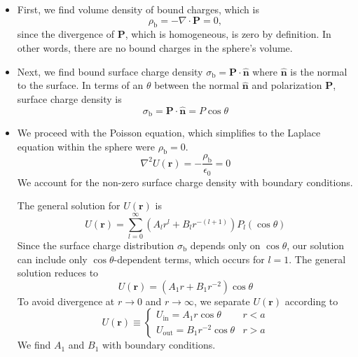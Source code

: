 \documentclass[11pt, a4paper]{article}
\renewcommand{\vec}[1]{\bm{#1}} %
\newcommand{\uvec}[1]{\hat{\vec{#1}}} %
\renewcommand{\r}{\vec{r}}
\newcommand{\ee}{\epsilon_{0}}  %
\renewcommand{\P}{\vec{P}}  %
\renewcommand{\div}{\nabla \cdot}
\renewcommand{\laplacian}{\nabla^{2}}
\begin{document}
\begin{itemize}
	\item First, we find volume density of bound charges, which is
	\begin{equation*}
		\rho_{\text{b}} = - \div \P = 0,
	\end{equation*}
	since the divergence of $ \P $, which is homogeneous, is zero by definition. In other words, there are no bound charges in the sphere's volume. 
	
	\item Next, we find bound surface charge density $ \sigma_{\text{b}} = \P \cdot \uvec{n} $ where $ \uvec{n} $ is the normal to the surface. In terms of an $ \theta $  between the normal $ \uvec{n} $ and polarization $ \P $, surface charge density is 
	\begin{equation*}
		\sigma_{\text{b}} = \P \cdot \uvec{n} = P \cos \theta
	\end{equation*}
	
	\item We proceed with the Poisson equation, which simplifies to the Laplace equation within the sphere were $ \rho_{\text{b}} = 0 $. 
	\begin{equation*}
		\laplacian U(\r) = - \frac{\rho_{\text{b}}}{\ee} = 0
	\end{equation*}
	We account for the non-zero surface charge density with boundary conditions. 
	
	The general solution for $ U(\r) $ is 
	\begin{equation*}
		U(\r) = \sum_{l = 0}^{\infty}(A_{l}r^{l} + B_{l}r^{-(l+1)})P_{l}(\cos \theta)
	\end{equation*}
	Since the surface charge distribution $ \sigma_{\text{b}} $ depends only on $ \cos \theta $, our solution can include only $ \cos \theta $-dependent terms, which occurs for $ l = 1 $. The general solution reduces to
	\begin{equation*}
		U(\r) = (A_{1}r + B_{1}r^{-2})\cos \theta
	\end{equation*}
	To avoid divergence at $ r \to 0 $ and $ r \to \infty $, we separate $ U(\r) $ according to
	\begin{equation*}
		U(\r) \equiv 
		\begin{cases}
			U_{\text{in}} = A_{1}r \cos \theta & r < a\\
			U_{\text{out}} = B_{1}r^{-2} \cos \theta & r > a
		\end{cases}
	\end{equation*}
	We find $ A_{1} $ and $ B_{1} $ with  boundary conditions. 
	

\end{itemize}
\end{document}
